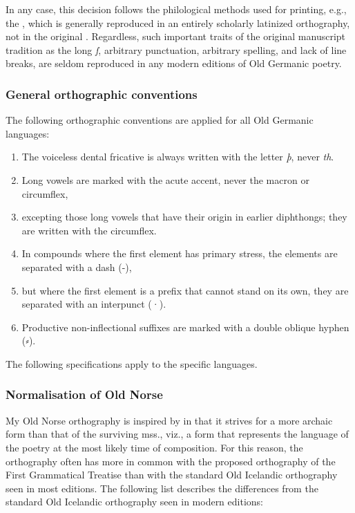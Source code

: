     In any case, this decision follows the philological methods used for printing, e.g., the \Rigveda, which is generally reproduced in an entirely scholarly latinized orthography, not in the original .
    Regardless, such important traits of the original manuscript tradition as the long \emph{ſ}, arbitrary punctuation, arbitrary spelling, and lack of line breaks, are seldom reproduced in any modern editions of Old Germanic poetry.

    \subsubsection{General orthographic conventions}

    The following orthographic conventions are applied for all Old Germanic languages:

    \begin{enumerate}
    \item The voiceless dental fricative is always written with the letter \emph{þ}, never \emph{th}.
    \item Long vowels are marked with the acute accent, never the macron or circumflex,
    \item excepting those long vowels that have their origin in earlier diphthongs; they are written with the circumflex.
    \item In compounds where the first element has primary stress, the elements are separated with a dash (-),
    \item but where the first element is a prefix that cannot stand on its own, they are separated with an interpunct (·).
    \item Productive non-inflectional suffixes are marked with a double oblique hyphen (⸗).
    \end{enumerate}

    The following specifications apply to the specific languages.

    \subsubsection{Normalisation of Old Norse}

    My Old Norse orthography is inspired by \textcite{FinnurEdda} in that it strives for a more archaic form than that of the surviving mss., viz., a form that represents the language of the poetry at the most likely time of composition.  For this reason, the orthography often has more in common with the proposed orthography of the First Grammatical Treatise \parencite{FGTHaugen} than with the standard Old Icelandic orthography seen in most editions.  The following list describes the differences from the standard Old Icelandic orthography seen in modern editions:

